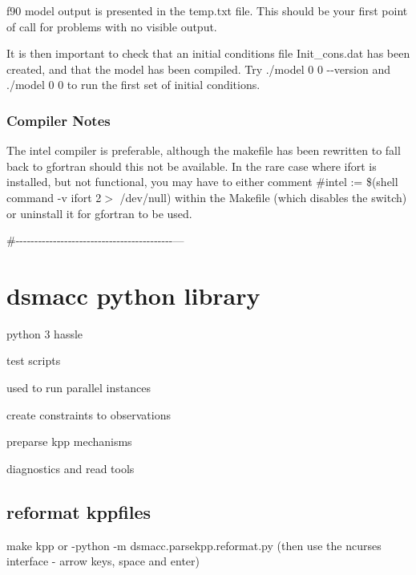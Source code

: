 f90 model output is presented in the temp.\+txt file. This should be your first point of call for problems with no visible output.

It is then important to check that an initial conditions file {\ttfamily Init\+\_\+cons.\+dat} has been created, and that the model has been compiled. Try {\ttfamily ./model 0 0 -\/-\/version} and {\ttfamily ./model 0 0} to run the first set of initial conditions.

\subsubsection*{Compiler Notes}

The intel compiler is preferable, although the makefile has been rewritten to fall back to gfortran should this not be available. In the rare case where ifort is installed, but not functional, you may have to either comment {\ttfamily \#intel \+:= \$(shell command -\/v ifort 2$>$ /dev/null)} within the Makefile (which disables the switch) or uninstall it for gfortran to be used.

\#-\/-\/-\/-\/-\/-\/-\/-\/-\/-\/-\/-\/-\/-\/-\/-\/-\/-\/-\/-\/-\/-\/-\/-\/-\/-\/-\/-\/-\/-\/-\/-\/-\/-\/-\/-\/-\/-\/-\/-\/-\/-\/---

\section*{dsmacc python library}


\begin{DoxyItemize}
\item python 3 hassle
\item test scripts
\item used to run parallel instances
\item create constraints to observations
\item preparse kpp mechanisms
\item diagnostics and read tools
\end{DoxyItemize}

\subsection*{reformat kppfiles}


\begin{DoxyItemize}
\item {\ttfamily make kpp} or -\/{\ttfamily python -\/m dsmacc.\+parsekpp.\+reformat.\+py} (then use the ncurses interface -\/ arrow keys, space and enter)
\end{DoxyItemize}

